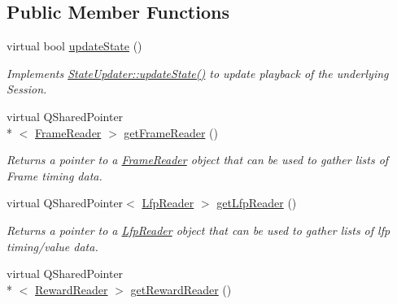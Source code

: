 \subsection*{Public Member Functions}
\begin{DoxyCompactItemize}
\item 
virtual bool \hyperlink{class_picto_1_1_playback_state_updater_a5af6cdbc6ff4a7d8010d941d7f05fc8c}{update\-State} ()
\begin{DoxyCompactList}\small\item\em Implements \hyperlink{class_picto_1_1_state_updater_a7554cc46eafbee58fb566edd93d5410e}{State\-Updater\-::update\-State()} to update playback of the underlying Session. \end{DoxyCompactList}\item 
\hypertarget{class_picto_1_1_playback_state_updater_a97c453087abe9ebf3daa5085f48a5427}{virtual Q\-Shared\-Pointer\\*
$<$ \hyperlink{class_picto_1_1_frame_reader}{Frame\-Reader} $>$ \hyperlink{class_picto_1_1_playback_state_updater_a97c453087abe9ebf3daa5085f48a5427}{get\-Frame\-Reader} ()}\label{class_picto_1_1_playback_state_updater_a97c453087abe9ebf3daa5085f48a5427}

\begin{DoxyCompactList}\small\item\em Returns a pointer to a \hyperlink{class_picto_1_1_frame_reader}{Frame\-Reader} object that can be used to gather lists of Frame timing data. \end{DoxyCompactList}\item 
\hypertarget{class_picto_1_1_playback_state_updater_a346b90e839ee9f27f5d2dd3acd4fa5b4}{virtual Q\-Shared\-Pointer$<$ \hyperlink{class_picto_1_1_lfp_reader}{Lfp\-Reader} $>$ \hyperlink{class_picto_1_1_playback_state_updater_a346b90e839ee9f27f5d2dd3acd4fa5b4}{get\-Lfp\-Reader} ()}\label{class_picto_1_1_playback_state_updater_a346b90e839ee9f27f5d2dd3acd4fa5b4}

\begin{DoxyCompactList}\small\item\em Returns a pointer to a \hyperlink{class_picto_1_1_lfp_reader}{Lfp\-Reader} object that can be used to gather lists of lfp timing/value data. \end{DoxyCompactList}\item 
\hypertarget{class_picto_1_1_playback_state_updater_abeaae2bc73cea286aaf780432aef693e}{virtual Q\-Shared\-Pointer\\*
$<$ \hyperlink{class_picto_1_1_reward_reader}{Reward\-Reader} $>$ \hyperlink{class_picto_1_1_playback_state_updater_abeaae2bc73cea286aaf780432aef693e}{get\-Reward\-Reader} ()}\label{class_picto_1_1_playback_state_updater_abeaae2bc73cea286aaf780432aef693e}


\end{DoxyCompactItemize}
